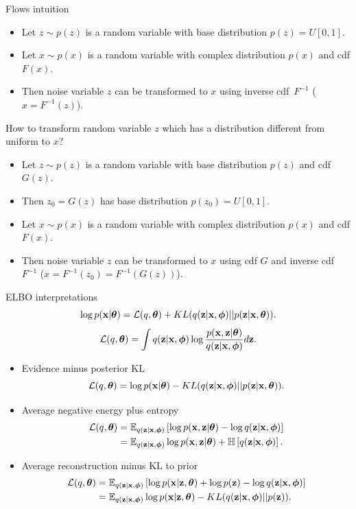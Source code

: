 \begin{frame}{Flows intuition}
	\begin{itemize}
		\item Let $z \sim p(z)$ is a random variable with base distribution $p(z) = U[0, 1]$. 
		\item Let $x \sim p(x)$ is a random variable with complex distribution $p(x)$ and cdf $F(x)$. 
		\item Then noise variable $z$ can be transformed to $x$ using inverse cdf~$F^{-1}$ ($x = F^{-1}(z)$).
	\end{itemize}
	How to transform random variable $z$  which has a distribution different from uniform to $x$?
	\begin{itemize}
		\item Let $z \sim p(z)$ is a random variable with base distribution $p(z)$ and cdf $G(z)$.
		\item Then $z_0 = G(z)$ has base distribution $p(z_0) = U[0, 1]$.
		\item Let $x \sim p(x)$ is a random variable with complex distribution $p(x)$ and cdf $F(x)$. 
		\item Then noise variable $z$ can be transformed to $x$ using cdf $G$ and inverse cdf~$F^{-1}$ ($x = F^{-1}(z_0) = F^{-1}(G(z))$).
	\end{itemize}
\end{frame}
\begin{frame}{ELBO interpretations}
	\[
		\log p(\mathbf{x} | \boldsymbol{\theta}) = \mathcal{L} (q, \boldsymbol{\theta}) + KL(q(\mathbf{z} | \mathbf{x}, \boldsymbol{\phi}) || p(\mathbf{z} | \mathbf{x}, \boldsymbol{\theta})).
	\]
	\[
		\mathcal{L} (q, \boldsymbol{\theta}) = \int q(\mathbf{z} | \mathbf{x}, \boldsymbol{\phi}) \log \frac{p(\mathbf{x}, \mathbf{z} | \boldsymbol{\theta})}{q(\mathbf{z} | \mathbf{x}, \boldsymbol{\phi})} d \mathbf{z}.
	\]
	\begin{itemize}
	    \item Evidence minus posterior KL
	    \vspace{-0.1cm}
	    \[
	        \mathcal{L}(q, \boldsymbol{\theta}) = \log p(\mathbf{x} | \boldsymbol{\theta}) - KL(q(\mathbf{z} | \mathbf{x}, \boldsymbol{\phi}) || p(\mathbf{z} | \mathbf{x}, \boldsymbol{\theta})).
	    \]
	    \item Average negative energy plus entropy
	    \vspace{-0.1cm}
	    \begin{align*}
	        \mathcal{L}(q, \boldsymbol{\theta}) &= \mathbb{E}_{q(\mathbf{z} | \mathbf{x}, \boldsymbol{\phi})} \left[\log p(\mathbf{x}, \mathbf{z} | \boldsymbol{\theta}) - \log q(\mathbf{z} | \mathbf{x}, \boldsymbol{\phi})  \right] \\
	        &= \mathbb{E}_{q(\mathbf{z} | \mathbf{x}, \boldsymbol{\phi})} \log p(\mathbf{x}, \mathbf{z} | \boldsymbol{\theta}) + \mathbb{H} \left[q(\mathbf{z} | \mathbf{x}, \boldsymbol{\phi}) \right].
	    \end{align*}
	    \item Average reconstruction minus KL to prior
	    \vspace{-0.1cm}
	    \begin{align*}
	        \mathcal{L}(q, \boldsymbol{\theta}) &= \mathbb{E}_{q(\mathbf{z} | \mathbf{x}, \boldsymbol{\phi})} \left[ \log p(\mathbf{x} | \mathbf{z}, \boldsymbol{\theta}) + \log p(\mathbf{z}) - \log q(\mathbf{z} | \mathbf{x}, \boldsymbol{\phi}) \right] \\
	        &= \mathbb{E}_{q(\mathbf{z} | \mathbf{x}, \boldsymbol{\phi})} \log p(\mathbf{x} | \mathbf{z}, \boldsymbol{\theta}) - KL(q(\mathbf{z} | \mathbf{x}, \boldsymbol{\phi}) || p(\mathbf{z})).
	    \end{align*}
	\end{itemize}
\end{frame}
